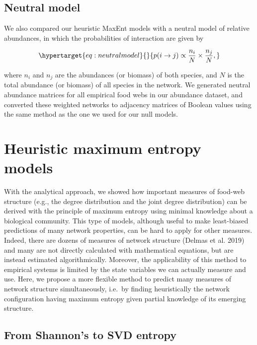 \documentclass[11pt]{article}
\begin{document}
\hypertarget{neutral-model}{%
\subsection{Neutral model}\label{neutral-model}}

We also compared our heuristic MaxEnt models with a neutral model of
relative abundances, in which the probabilities of interaction are given
by

\begin{equation}\protect\hypertarget{eq:neutralmodel}{}{p(i \rightarrow j) \propto \frac{n_i}{N} \times \frac{n_j}{N},}\label{eq:neutralmodel}\end{equation}

where \(n_i\) and \(n_j\) are the abundances (or biomass) of both
species, and \(N\) is the total abundance (or biomass) of all species in
the network. We generated neutral abundance matrices for all empirical
food webs in our abundance dataset, and converted these weighted
networks to adjacency matrices of Boolean values using the same method
as the one we used for our null models.

\hypertarget{heuristic-maximum-entropy-models}{%
\section{Heuristic maximum entropy
models}\label{heuristic-maximum-entropy-models}}

With the analytical approach, we showed how important measures of
food-web structure (e.g., the degree distribution and the joint degree
distribution) can be derived with the principle of maximum entropy using
minimal knowledge about a biological community. This type of models,
although useful to make least-biased predictions of many network
properties, can be hard to apply for other measures. Indeed, there are
dozens of measures of network structure (Delmas et al. 2019) and many
are not directly calculated with mathematical equations, but are instead
estimated algorithmically. Moreover, the applicability of this method to
empirical systems is limited by the state variables we can actually
measure and use. Here, we propose a more flexible method to predict many
measures of network structure simultaneously, i.e.~by finding
heuristically the network configuration having maximum entropy given
partial knowledge of its emerging structure.

\hypertarget{from-shannons-to-svd-entropy}{%
\subsection{From Shannon's to SVD
entropy}\label{from-shannons-to-svd-entropy}}
\end{document}
